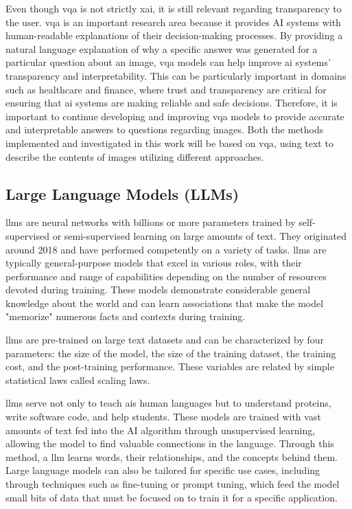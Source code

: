 Even though \gls{vqa} is not strictly \gls{xai}, it is still relevant regarding transparency to the user. \gls{vqa} is an important research area because it provides AI systems with human-readable explanations of their decision-making processes.
By providing a natural language explanation of why a specific answer was generated for a particular question about an image, \gls{vqa} models can help improve \gls{ai} systems' transparency and interpretability. This can be particularly important in domains such as healthcare and finance, where trust and transparency are critical for ensuring that \gls{ai} systems are making reliable and safe decisions. Therefore, it is important to continue developing and improving \gls{vqa} models to provide accurate and interpretable answers to questions regarding images.
Both the methods implemented and investigated in this work will be based on \gls{vqa}, using text to describe the contents of images utilizing different approaches.

\subsection{Large Language Models (LLMs)}

    \glspl{llm} are neural networks with billions or more parameters trained by self-supervised or semi-supervised learning on large amounts of text. They originated around 2018 and have performed competently on a variety of tasks. \glspl{llm} are typically general-purpose models that excel in various roles, with their performance and range of capabilities depending on the number of resources devoted during training. These models demonstrate considerable general knowledge about the world and can learn associations that make the model "memorize" numerous facts and contexts during training. 

    
    
    \glspl{llm} are pre-trained on large text datasets and can be characterized by four parameters: the size of the model, the size of the training dataset, the training cost, and the post-training performance. These variables are related by simple statistical laws called scaling laws. 

    \glspl{llm} serve not only to teach \glspl{ai} human languages but to understand proteins, write software code, and help students. These models are trained with vast amounts of text fed into the AI algorithm through unsupervised learning, allowing the model to find valuable connections in the language. Through this method, a \gls{llm} learns words, their relationships, and the concepts behind them. Large language models can also be tailored for specific use cases, including through techniques such as fine-tuning or prompt tuning, which feed the model small bits of data that must be focused on to train it for a specific application.
    
